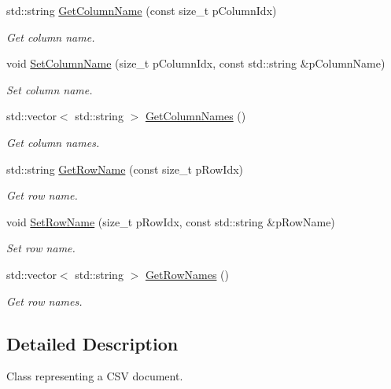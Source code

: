 \begin{DoxyCompactItemize}
std\+::string \hyperlink{classrapidcsv_1_1Document_a9fca205870e1d9237f6b4bf0634ceb9c}{Get\+Column\+Name} (const size\+\_\+t p\+Column\+Idx)
\begin{DoxyCompactList}\small\item\em Get column name. \end{DoxyCompactList}\item 
void \hyperlink{classrapidcsv_1_1Document_a4c9c8e85a9ccefea28068c460ebb725e}{Set\+Column\+Name} (size\+\_\+t p\+Column\+Idx, const std\+::string \&p\+Column\+Name)
\begin{DoxyCompactList}\small\item\em Set column name. \end{DoxyCompactList}\item 
std\+::vector$<$ std\+::string $>$ \hyperlink{classrapidcsv_1_1Document_a90c8562f50d27cae80623ba9bbfd3d95}{Get\+Column\+Names} ()
\begin{DoxyCompactList}\small\item\em Get column names. \end{DoxyCompactList}\item 
std\+::string \hyperlink{classrapidcsv_1_1Document_aa3b25e906bf2ad2ca01a969a6e60eca3}{Get\+Row\+Name} (const size\+\_\+t p\+Row\+Idx)
\begin{DoxyCompactList}\small\item\em Get row name. \end{DoxyCompactList}\item 
void \hyperlink{classrapidcsv_1_1Document_a5596b4c6751e883584bacf3922316eab}{Set\+Row\+Name} (size\+\_\+t p\+Row\+Idx, const std\+::string \&p\+Row\+Name)
\begin{DoxyCompactList}\small\item\em Set row name. \end{DoxyCompactList}\item 
std\+::vector$<$ std\+::string $>$ \hyperlink{classrapidcsv_1_1Document_a0056283ff602ee5936dabae43e51b0ba}{Get\+Row\+Names} ()
\begin{DoxyCompactList}\small\item\em Get row names. \end{DoxyCompactList}\end{DoxyCompactItemize}


\subsection{Detailed Description}
Class representing a C\+SV document. 

